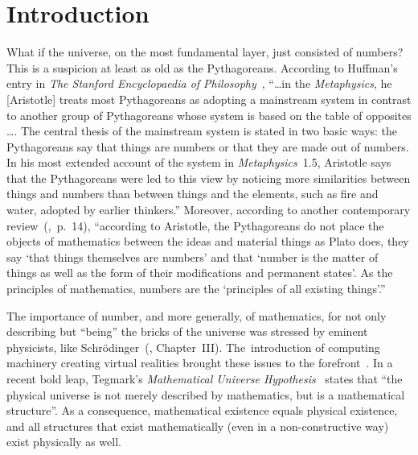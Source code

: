 \documentclass[12pt]{article}
\begin{document}
\section{Introduction}
\label{2018-was-sec1}
What if the universe, on the most fundamental layer, just consisted of numbers?
This is a suspicion at least as old as the Pythagoreans.
According to Huffman's entry in {\it The Stanford Encyclopaedia of Philosophy}~\cite{sep-pythagoreanism},
``\dots  in the {\em Metaphysics}, he [Aristotle] treats most Pythagoreans
as adopting a mainstream system in contrast to another group of Pythagoreans
whose system is based on the table of opposites \dots .
The central thesis of the mainstream system is stated in two basic ways:
the Pythagoreans say that things are numbers or that they are made out of numbers.
In his most extended account of the system in {\em Metaphysics}~1.5,
Aristotle says that the Pythagoreans were led to this view
by noticing more similarities between things and numbers than between things and the elements,
such as fire and water, adopted by earlier thinkers.''
Moreover, according to another contemporary review~(\cite{mg1968},~p.~14),
``according to Aristotle, the Pythagoreans do not place the objects of mathematics
between the ideas and material things as Plato does,
they say `that things themselves are numbers' and that
`number is the matter of things as well as the form of their modifications and permanent states'.
As the principles of mathematics, numbers are the `principles of all existing things'.''


%
The importance of number, and more generally, of mathematics,  for not only describing
but ``being'' the bricks of the universe was stressed  by eminent physicists, like
Schr\"odinger~(\cite[]{schroed:natgr}, Chapter~III).
The~introduction of computing machinery creating virtual realities
brought these issues to the forefront~\cite{zuse-69,zuse-70,fredkin,toffoli:79,margolus-billard,wolfram-2002}.
In a recent bold leap,
Tegmark's {\em Mathematical Universe
Hypothesis}~\cite{tegmark2007,tegmark2014} states that ``the physical universe is not merely described by
mathematics, but is a mathematical structure''. As a consequence, mathematical existence equals physical existence, and
all structures that exist mathematically (even in a non-constructive way) exist physically as well.
\end{document}
